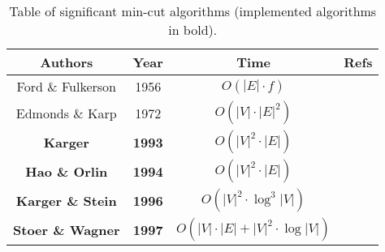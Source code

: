 \vspace{20pt}

\begin{table}[ht]
    \centering
    \begin{tabular}{c|c|c|c}
        \textbf{Authors} & \textbf{Year} & \textbf{Time} & \textbf{Refs}\\ \hline
        Ford \& Fulkerson & 1956 & $O(|E| \cdot f)$ & \cite{ford1956maximal} \\
        Edmonds \& Karp & 1972 & $O(|V| \cdot |E|^2)$ & \cite{karp1972reducibility} \\
        \textbf{Karger} & \textbf{1993} & \textbf{$O(|V|^2 \cdot |E|)$} & \cite{karger1993global} \\
        \textbf{Hao \& Orlin} & \textbf{1994} & \textbf{$O(|V|^2 \cdot |E|)$} & \cite{hao1994faster} \\
        \textbf{Karger \& Stein} & \textbf{1996} & \textbf{$O(|V|^2 \cdot \log^3 |V|)$} & \cite{karger1996new} \\
        \textbf{Stoer \& Wagner} & \textbf{1997} & \textbf{$O(|V| \cdot |E| + |V|^2 \cdot \log|V|)$} & \cite{stoer1997simple} \\
    \end{tabular}
    \caption{Table of significant min-cut algorithms (implemented algorithms in bold).}
\end{table}

